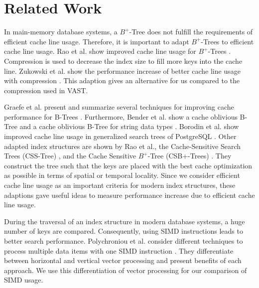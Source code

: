 \documentclass[runningheads,a4paper]{llncs}
\begin{document}

\section{Related Work}
In main-memory database systems, a $B^+$-Tree does not fulfill the requirements of efficient cache line usage. Therefore, it is important to adapt $B^+$-Trees to efficient cache line usage. Rao et al. show improved cache line usage for $B^+$-Trees \cite{rao1999cache}. Compression is used to decrease the index size to fill more keys into the cache line. Zukowski et al. show the performance increase of better cache line usage with compression \cite{zukowski2006super}. This adaption gives an alternative for us compared to the compression used in VAST. 

Graefe et al. present and summarize several techniques for improving cache performance for B-Trees \cite{graefe2001b}. Furthermore, Bender et al. show a cache oblivious B-Tree \cite{bender2000cache} and a cache oblivious B-Tree for string data types \cite{bender2006cache}. Borodin et al. show improved cache line usage in generalized search trees of PostgreSQL \cite{borodin2017optimization}. Other adapted index structures are shown by Rao et al., the Cache-Sensitive Search Trees (CSS-Tree) \cite{rao1999cache}, and the Cache Sensitive $B^+$-Tree (CSB+-Trees) \cite{rao2000making}. They construct the tree such that the keys are placed with the best cache optimization as possible in terms of spatial or temporal locality. Since we consider efficient cache line usage as an important criteria for modern index structures, these adaptions gave useful ideas to measure performance increase due to efficient cache line usage. 

During the traversal of an index structure in modern database systems, a huge number of keys are compared. Consequently, using SIMD instructions leads to better search performance. Polychroniou et al. consider different techniques to process multiple data items with one SIMD instruction \cite{polychroniou2015rethinking}. They differentiate between horizontal and vertical vector processing and present benefits of each approach. We use this differentiation of vector processing for our comparison of SIMD usage.  
\end{document}
